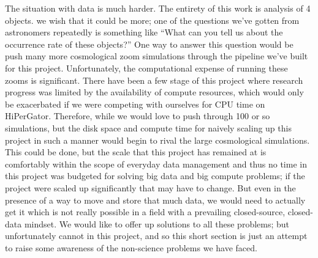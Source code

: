The situation with data is much harder.
The entirety of this work is analysis of 4 objects.
we wish that it could be more; one of the questions we've gotten from astronomers repeatedly is something like ``What can you tell us about the occurrence rate of these objects?''
One way to answer this question would be push many more cosmological zoom simulations through the pipeline we've built for this project.
Unfortunately, the computational expense of running these zooms is significant.
There have been a few stage of this project where research progress was limited by the availability of compute resources, which would only be exacerbated if we were competing with ourselves for CPU time on HiPerGator.
Therefore, while we would love to push through 100 or so simulations, but the disk space and compute time for naively scaling up this project in such a manner would begin to rival the large cosmological simulations.
This could be done, but the scale that this project has remained at is comfortably within the scope of everyday data management and thus no time in this project was budgeted for solving big data and big compute problems; if the project were scaled up significantly that may have to change.
But even in the presence of a way to move and store that much data, we would need to actually get it which is not really possible in a field with a prevailing closed-source, closed-data mindset.
We would like to offer up solutions to all these problems; but unfortunately cannot in this project, and so this short section is just an attempt to raise some awareness of the non-science problems we have faced.

